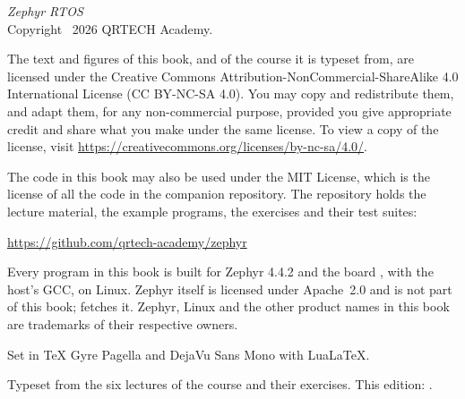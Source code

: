 \thispagestyle{empty}
\vspace*{\fill}
{\small
\noindent\textit{Zephyr RTOS}\\
Copyright \textcopyright\ 2026 QRTECH Academy.

\medskip
\noindent The text and figures of this book, and of the course it is typeset from, are licensed
under the Creative Commons Attribution-NonCommercial-ShareAlike 4.0 International License
(CC BY-NC-SA 4.0). You may copy and redistribute them, and adapt them, for any non-commercial
purpose, provided you give appropriate credit and share what you make under the same license. To
view a copy of the license, visit \url{https://creativecommons.org/licenses/by-nc-sa/4.0/}.

\medskip
\noindent The code in this book may also be used under the MIT License, which is the license of all
the code in the companion repository. The repository holds the lecture material, the example
programs, the exercises and their test suites:

\medskip
\noindent\url{https://github.com/qrtech-academy/zephyr}

\medskip
\noindent Every program in this book is built for Zephyr 4.4.2 and the board
, with the host's GCC, on Linux. Zephyr itself is licensed under
Apache~2.0 and is not part of this book;  fetches it. Zephyr, Linux and the other
product names in this book are trademarks of their respective owners.

\medskip
\noindent Set in TeX Gyre Pagella and DejaVu Sans Mono with Lua\LaTeX.

\medskip
\noindent\textcolor{muted}{Typeset from the six lectures of the course and their exercises. This
edition: \bookedition.}
\par}
\cleardoublepage
